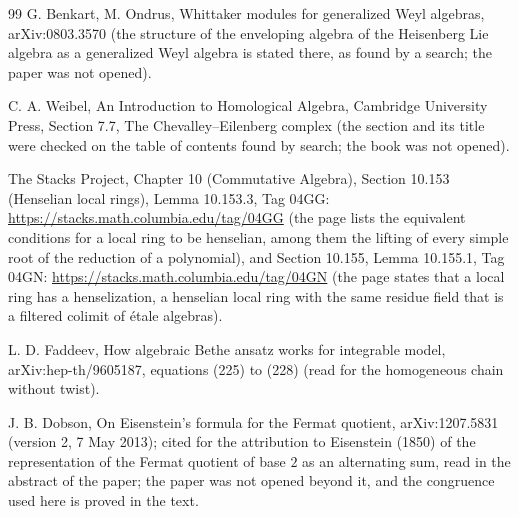 \documentclass[11pt]{article}
\theoremstyle{definition}
\theoremstyle{remark}
\begin{document}
\begin{thebibliography}{99}
 G. Benkart, M. Ondrus, Whittaker modules for generalized Weyl algebras, arXiv:0803.3570 (the structure of the enveloping algebra of the Heisenberg Lie algebra as a generalized Weyl algebra is stated there, as found by a search; the paper was not opened).

 C. A. Weibel, An Introduction to Homological Algebra, Cambridge University Press, Section 7.7, The Chevalley--Eilenberg complex (the section and its title were checked on the table of contents found by search; the book was not opened).

 The Stacks Project, Chapter 10 (Commutative Algebra), Section 10.153 (Henselian local rings), Lemma 10.153.3, Tag 04GG: \url{https://stacks.math.columbia.edu/tag/04GG} (the page lists the equivalent conditions for a local ring to be henselian, among them the lifting of every simple root of the reduction of a polynomial), and Section 10.155, Lemma 10.155.1, Tag 04GN: \url{https://stacks.math.columbia.edu/tag/04GN} (the page states that a local ring has a henselization, a henselian local ring with the same residue field that is a filtered colimit of \'etale algebras).

 L. D. Faddeev, How algebraic Bethe ansatz works for integrable model, arXiv:hep-th/9605187, equations (225) to (228) (read for the homogeneous chain without twist).

 J. B. Dobson, On Eisenstein's formula for the Fermat quotient, arXiv:1207.5831 (version 2, 7 May 2013); cited for the attribution to Eisenstein (1850) of the representation of the Fermat quotient of base $2$ as an alternating sum, read in the abstract of the paper; the paper was not opened beyond it, and the congruence used here is proved in the text.

\end{thebibliography}
\endgroup
\end{document}

